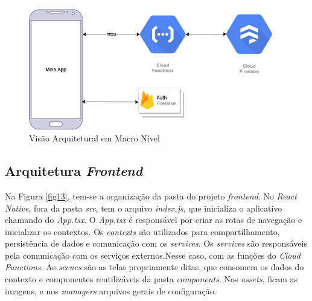 \begin{figure}[htbp]
	\caption{Visão Arquitetural em Macro Nível}
	\begin{center}
	\includegraphics[keepaspectratio=true,scale=0.6]{figuras/architecture.png}
	\end{center}
    \label{fig12}
\end{figure}

\newpage
\subsection{Arquitetura \emph{Frontend}}

Na Figura \ref{fig13}, tem-se a organização da pasta do projeto \emph{frontend}. No \emph{React Native}, fora 
da pasta \emph{src}, tem o arquivo \emph{index.js}, que inicializa o aplicativo chamando do \emph{App.tsx}. 
O \emph{App.tsx} é responsável 
por criar as rotas de navegação e inicializar os contextos. Os \emph{contexts} são utilizados 
para compartilhamento, 
persistência de dados e comunicação com os \emph{services}. Os \emph{services} são responsáveis pela 
comunicação com 
os serviços externos.Nesse caso, com as funções do \emph{Cloud Functions}. As \emph{scenes} são as 
telas propriamente ditas, 
que consomem os dados do contexto e componentes reutilizáveis da pasta \emph{components}. 
Nos \emph{assets}, ficam as imagens, e 
nos \emph{managers} arquivos gerais de configuração. 

